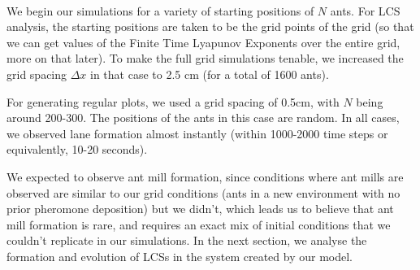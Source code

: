 \

We begin our simulations for a variety of starting positions of $N$ ants. For LCS analysis, the starting positions are taken to be the grid points of the grid (so that we can get values of the Finite Time Lyapunov Exponents over the entire grid, more on that later). To make the full grid simulations tenable, we increased the grid spacing $\Delta x$ in that case to 2.5 cm (for a total of 1600 ants).

For generating regular plots, we used a grid spacing of 0.5cm, with $N$ being around 200-300. The positions of the ants in this case are random. In all cases, we observed lane formation almost instantly (within 1000-2000 time steps or equivalently, 10-20 seconds).

We expected to observe ant mill formation, since conditions where ant mills are observed are similar to our grid conditions (ants in a new environment with no prior pheromone deposition) but we didn't, which leads us to believe that ant mill formation is rare, and requires an exact mix of initial conditions that we couldn't replicate in our simulations. In the next section, we analyse the formation and evolution of LCSs in the system created by our model.


